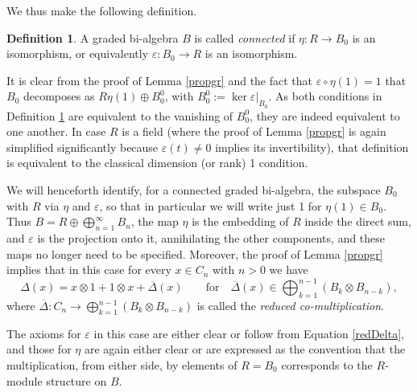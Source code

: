 \documentclass{article}
\theoremstyle{definition}
\newtheorem{defn}[thm]{Definition}
\begin{document}
We thus make the following definition.
\begin{defn}
A graded bi-algebra $B$ is called \emph{connected} if $\eta:R \to B_{0}$ is an isomorphism, or equivalently $\varepsilon:B_{0} \to R$ is an isomorphism. \label{condef}
\end{defn}
It is clear from the proof of Lemma \ref{propgr} and the fact that $\varepsilon\circ\eta(1)=1$ that $B_{0}$ decomposes as $R\eta(1) \oplus B_{0}^{0}$, with $B_{0}^{0}:=\ker\varepsilon|_{B_{0}}$. As both conditions in Definition \ref{condef} are equivalent to the vanishing of $B_{0}^{0}$, they are indeed equivalent to one another. In case $R$ is a field (where the proof of Lemma \ref{propgr} is again simplified significantly because $\varepsilon(t)\neq0$ implies its invertibility), that definition is equivalent to the classical dimension (or rank) 1 condition.

We will henceforth identify, for a connected graded bi-algebra, the subspace $B_{0}$ with $R$ via $\eta$ and $\varepsilon$, so that in particular we will write just 1 for $\eta(1) \in B_{0}$. Thus $B=R\oplus\bigoplus_{n=1}^{\infty}B_{n}$, the map $\eta$ is the embedding of $R$ inside the direct sum, and $\varepsilon$ is the projection onto it, annihilating the other components, and these maps no longer need to be specified. Moreover, the proof of Lemma \ref{propgr} implies that in this case for every $x \in C_{n}$ with $n>0$ we have
\begin{equation}
\Delta(x)=x\otimes1+1 \otimes x+\overline{\Delta}(x)\qquad\mathrm{for}\quad\overline{\Delta}(x)\in\bigoplus_{k=1}^{n-1}(B_{k} \otimes B_{n-k}), \label{redDelta}
\end{equation}
where $\overline{\Delta}:C_{n}\to\bigoplus_{k=1}^{n-1}(B_{k} \otimes B_{n-k})$ is called the \emph{reduced co-multiplication}.

The axioms for $\varepsilon$ in this case are either clear or follow from Equation \eqref{redDelta}, and those for $\eta$ are again either clear or are expressed as the convention that the multiplication, from either side, by elements of $R=B_{0}$ corresponds to the $R$-module structure on $B$.

\medskip
\end{document}
